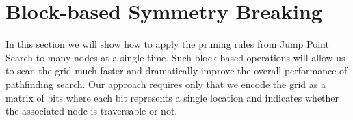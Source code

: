 \section{Block-based Symmetry Breaking}
\label{sec::blocks2}
In this section
we will show how to apply the pruning rules from Jump Point Search to many 
nodes at a single
time. Such block-based operations will allow us to scan the grid much faster
and dramatically improve the overall performance of pathfinding search.
Our approach requires only that we encode the grid as a matrix of bits where
each bit represents a single location and indicates whether the associated
node is traversable or not.




